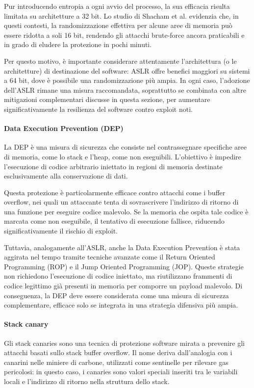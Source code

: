Pur introducendo entropia a ogni avvio del processo, la sua efficacia risulta
limitata su architetture a 32 bit. Lo studio di Shacham et al.\cite{aslr_effectiveness}
evidenzia che, in questi contesti, la randomizzazione effettiva per alcune aree di
memoria può essere ridotta a soli 16 bit, rendendo gli attacchi brute-force
ancora praticabili e in grado di eludere la protezione in pochi minuti.

Per questo motivo, è importante considerare attentamente l'architettura (o le
architetture) di destinazione del software: ASLR offre benefici maggiori su
sistemi a 64 bit, dove è possibile una randomizzazione più ampia. In ogni caso, l'adozione
dell'ASLR rimane una misura raccomandata, soprattutto se combinata con altre
mitigazioni complementari discusse in questa sezione, per aumentare significativamente
la resilienza del software contro exploit noti.

\paragraph{Data Execution Prevention (DEP)}
La DEP è una misura di sicurezza che consiste nel contrassegnare specifiche aree
di memoria, come lo stack e l'heap, come non eseguibili. L'obiettivo è impedire l'esecuzione
di codice arbitrario iniettato in regioni di memoria destinate esclusivamente alla
conservazione di dati.

Questa protezione è particolarmente efficace contro attacchi come i buffer overflow,
nei quali un attaccante tenta di sovrascrivere l'indirizzo di ritorno di una
funzione per eseguire codice malevolo. Se la memoria che ospita tale codice è marcata
come non eseguibile, il tentativo di esecuzione fallisce, riducendo significativamente
il rischio di exploit.

Tuttavia, analogamente all'ASLR, anche la Data Execution Prevention è stata aggirata
nel tempo tramite tecniche avanzate come il Return Oriented Programming (ROP) e il
Jump Oriented Programming (JOP). Queste strategie non richiedono l'esecuzione di
codice iniettato, ma riutilizzano frammenti di codice legittimo già presenti in memoria
per comporre un payload malevolo. Di conseguenza, la DEP deve essere considerata
come una misura di sicurezza complementare, efficace solo se integrata in una
strategia difensiva più ampia.

\paragraph{Stack canary}
Gli stack canaries sono una tecnica di protezione software mirata a prevenire gli
attacchi basati sullo stack buffer overflow. Il nome deriva dall'analogia con i
canarini nelle miniere di carbone, utilizzati come sentinelle per rilevare gas pericolosi:
in questo caso, i canaries sono valori speciali inseriti tra le variabili locali
e l'indirizzo di ritorno nella struttura dello stack.

